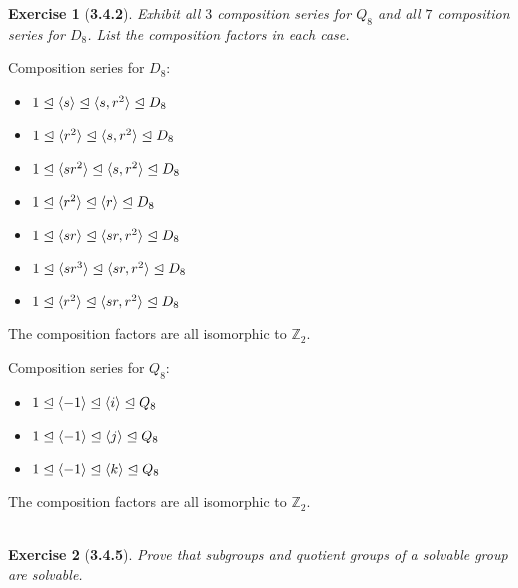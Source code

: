 \documentclass[10pt,oneside,reqno]{amsart}
\theoremstyle{plain}
\newtheorem*{e}{Exercise}
\theoremstyle{definition}
\newcommand{\norm}{\trianglelefteq}
\begin{document}
\begin{e}[\textbf{3.4.2}]
Exhibit all $3$ composition series for $Q_8$ and all $7$ composition series for $D_8$. List the composition factors in each case. 
\end{e}
Composition series for $D_8$: 
\begin{itemize}
\item $1 \norm \braket{s} \norm \braket{s,r^2} \norm D_8$
\item $1 \norm \braket{r^2} \norm \braket{s,r^2} \norm D_8$
\item $1 \norm \braket{sr^2} \norm \braket{s,r^2} \norm D_8$
\item $1 \norm \braket{r^2} \norm \braket{r} \norm D_8$

\item $1 \norm \braket{sr} \norm \braket{sr, r^2} \norm D_8$
\item $1 \norm \braket{sr^3} \norm \braket{sr, r^2} \norm D_8$
\item $1 \norm \braket{r^2} \norm \braket{sr, r^2} \norm D_8$

\end{itemize}
The composition factors are all isomorphic to $\mathbb{Z}_2$. 

Composition series for $Q_8$: 

\begin{itemize}
\item $1 \norm \braket{-1} \norm \braket{i} \norm Q_8$
\item $1 \norm \braket{-1} \norm \braket{j} \norm Q_8$
\item $1 \norm \braket{-1} \norm \braket{k} \norm Q_8$
\end{itemize}
The composition factors are all isomorphic to $\mathbb{Z}_2$. \\\\

\begin{e}[\textbf{3.4.5}]
Prove that subgroups and quotient groups of a solvable group are solvable. 
\end{e}
\end{document}
